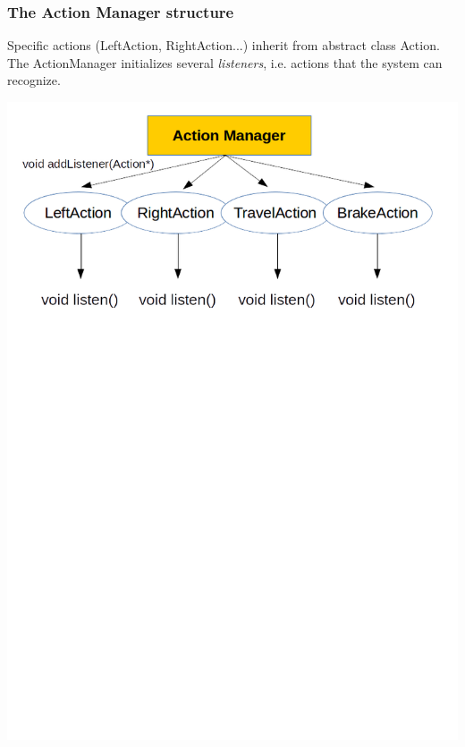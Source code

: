 \documentclass{beamer}
\begin{document}
\begin{frame}
\frametitle{The Action Manager structure}
Specific actions (LeftAction, RightAction...) inherit from abstract class Action. The ActionManager initializes several \textit{listeners}, i.e. actions that the system can recognize.
\bigskip
\bigskip
\bigskip

\centering
\includegraphics[scale=0.5]{ActionManager}

\end{frame}
\end{document}
